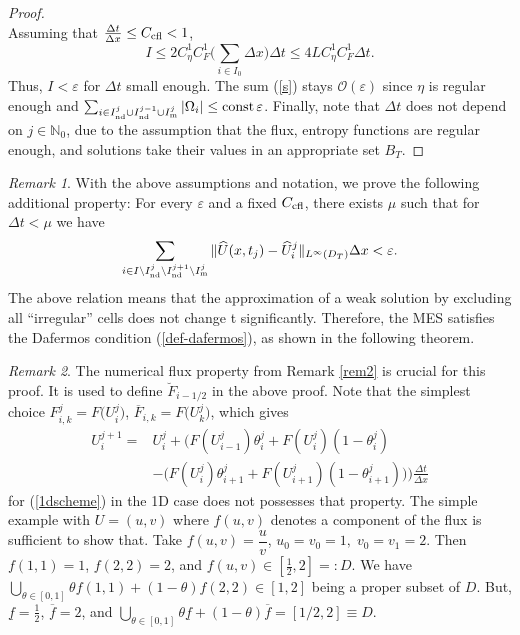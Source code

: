 \documentclass[11pt,a4paper,reqno]{amsart}
\theoremstyle{plain}
\theoremstyle{definition}
\theoremstyle{remark}
\newtheorem{remark}{Remark}[section]
\numberwithin{equation}{section}
\begin{document}
{\begin{proof}
\[\]
Assuming that $\frac{\Delta t}{\Delta x} \leq C_{\rm cfl}<1$, 
\[
I \leq 2C_{\eta}^{1} C_{F}^{1} \Big( \sum_{i\in I_{0}}\Delta x\Big) 
\Delta t \leq 4 L C_{\eta}^{1} C_{F}^{1} \Delta t. 
\] 
Thus, $I<\varepsilon$ for $\Delta t$ small enough.
The sum (\ref{s}) stays $\mathcal{O}(\varepsilon)$ since 
$\eta$ is regular enough and 
$\sum_{i\in I_{\rm nd}^{j} \cup I_{\rm nd}^{j-1} \cup I_{\rm m}^{j}}
|\Omega_{i}|\leq \mathop{\rm const} \varepsilon$.
Finally, note that $\Delta t$ does not depend on $j\in \mathbb{N}_{0}$, 
due to the assumption that the flux, entropy functions are regular enough,
and solutions take their values in an appropriate set $B_{T}$.
\end{proof}  


\begin{remark}
With the above assumptions and notation, we prove the following additional property:
For every $\varepsilon$ and a fixed $C_{\rm cfl}$, there exists $\mu$ such
that for $\Delta t<\mu$ we have
\begin{equation} \label{hatlinf}
\sum_{i\in I\setminus I_{\rm nd}^{j}\setminus I_{\rm nd}^{j+1}
\setminus I_{\rm m}^{j}}
\| \widehat{U}(x,t_{j}) - \widehat{U}_{i}^{j}\|_{L^{\infty}(D_{T})}{\Delta x} 
< \varepsilon.
\end{equation}
The above relation means that the approximation of a weak 
solution by excluding all ``irregular'' cells does not change 
t significantly. Therefore, the MES satisfies the Dafermos condition 
(\ref{def-dafermos}), as shown in the following theorem.
\end{remark}

\begin{remark} \label{rem4}
The numerical flux property from Remark \ref{rem2} is crucial for this proof.
It is used to define $\breve{F}_{i-1/2}$ in the above proof.
Note that the simplest choice $F_{i,k}^{j} = F \big( U _{i}^{j} \big)$,
$\overline{F} _{i , k} = F \big( U _{k}^{j} \big)$, which gives
\[
\begin{split}
U_{i}^{j+1} =  & U _{i}^{j} + \Big( F(U_{i-1}^{j})
\theta _{i}^{j} + F( U_{i}^{j}) (1 - \theta _{i}^{j}) \\ 
& - \big( F( U _{i}^{j}) \theta_{i + 1}^{j} + F( U_{i + 1}^{j})
( 1 - \theta _{i + 1}^{j} ) \big) \Big) \frac{\Delta t}{\Delta x}
\end{split}
\]
for (\ref{1dscheme}) in the 1D case does not possesses that property.
The simple example with $U=(u,v)$ where $f(u,v)$ denotes
a component of the flux is sufficient to show that. Take 
$f(u,v) = \dfrac{u}{v}$,   $u _{0} = v _{0} = 1 , \; v _{0} = v _{1} = 2$.
Then 
$f(1,1)=1$, $f ( 2 , 2 ) = 2$, and
$f ( u , v ) \in [ \frac{1}{2} , 2 ] =: D$.
We have 
$\bigcup_{\theta \in [0,1]}
\theta f ( 1 , 1 ) + ( 1 - \theta ) f ( 2, 2 )
\in [ 1 , 2 ]$ being a proper subset of $D$.
But, 
$\underline{f} = \frac{1}{2}$, $\overline{f} = 2$, and
$\bigcup_{\theta \in [0,1]}
\theta \underline{f} + (1 - \theta) \overline{f} = [ 1/2 , 2 ] \equiv D$.
\end{remark}


}
\end{document}
